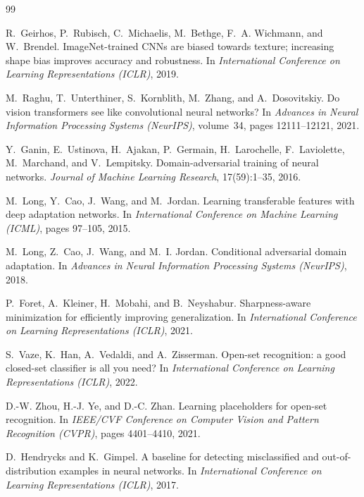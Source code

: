 \documentclass{article}
\begin{document}
\newpage

\begin{thebibliography}{99}

R.~Geirhos, P.~Rubisch, C.~Michaelis, M.~Bethge, F.~A. Wichmann, and W.~Brendel.
\newblock Image{N}et-trained {CNN}s are biased towards texture; increasing shape bias improves accuracy and robustness.
\newblock In \emph{International Conference on Learning Representations (ICLR)}, 2019.

M.~Raghu, T.~Unterthiner, S.~Kornblith, M.~Zhang, and A.~Dosovitskiy.
\newblock Do vision transformers see like convolutional neural networks?
\newblock In \emph{Advances in Neural Information Processing Systems (NeurIPS)}, volume~34, pages 12111--12121, 2021.

Y.~Ganin, E.~Ustinova, H.~Ajakan, P.~Germain, H.~Larochelle, F.~Laviolette, M.~Marchand, and V.~Lempitsky.
\newblock Domain-adversarial training of neural networks.
\newblock \emph{Journal of Machine Learning Research}, 17(59):1--35, 2016.

M.~Long, Y.~Cao, J.~Wang, and M.~Jordan.
\newblock Learning transferable features with deep adaptation networks.
\newblock In \emph{International Conference on Machine Learning (ICML)}, pages 97--105, 2015.

M.~Long, Z.~Cao, J.~Wang, and M.~I. Jordan.
\newblock Conditional adversarial domain adaptation.
\newblock In \emph{Advances in Neural Information Processing Systems (NeurIPS)}, 2018.

P.~Foret, A.~Kleiner, H.~Mobahi, and B.~Neyshabur.
\newblock Sharpness-aware minimization for efficiently improving generalization.
\newblock In \emph{International Conference on Learning Representations (ICLR)}, 2021.

S.~Vaze, K.~Han, A.~Vedaldi, and A.~Zisserman.
\newblock Open-set recognition: a good closed-set classifier is all you need?
\newblock In \emph{International Conference on Learning Representations (ICLR)}, 2022.

D.-W. Zhou, H.-J. Ye, and D.-C. Zhan.
\newblock Learning placeholders for open-set recognition.
\newblock In \emph{IEEE/CVF Conference on Computer Vision and Pattern Recognition (CVPR)}, pages 4401--4410, 2021.

D.~Hendrycks and K.~Gimpel.
\newblock A baseline for detecting misclassified and out-of-distribution examples in neural networks.
\newblock In \emph{International Conference on Learning Representations (ICLR)}, 2017.


\end{thebibliography}
\end{document}
